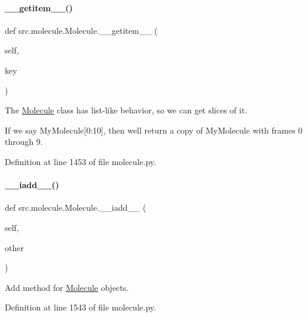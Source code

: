 \paragraph{\texorpdfstring{\+\_\+\+\_\+getitem\+\_\+\+\_\+()}{\_\_getitem\_\_()}}
{\footnotesize\ttfamily def src.\+molecule.\+Molecule.\+\_\+\+\_\+getitem\+\_\+\+\_\+ (\begin{DoxyParamCaption}\item[{}]{self,  }\item[{}]{key }\end{DoxyParamCaption})}



The \hyperlink{classsrc_1_1molecule_1_1Molecule}{Molecule} class has list-\/like behavior, so we can get slices of it. 

If we say My\+Molecule\mbox{[}0\+:10\mbox{]}, then we\textquotesingle{}ll return a copy of My\+Molecule with frames 0 through 9. 

Definition at line 1453 of file molecule.\+py.

\mbox{\label{classsrc_1_1molecule_1_1Molecule_a4a1e6648a99afd550e7b24db3a2b249b}} 
\paragraph{\texorpdfstring{\+\_\+\+\_\+iadd\+\_\+\+\_\+()}{\_\_iadd\_\_()}}
{\footnotesize\ttfamily def src.\+molecule.\+Molecule.\+\_\+\+\_\+iadd\+\_\+\+\_\+ (\begin{DoxyParamCaption}\item[{}]{self,  }\item[{}]{other }\end{DoxyParamCaption})}



Add method for \hyperlink{classsrc_1_1molecule_1_1Molecule}{Molecule} objects. 



Definition at line 1543 of file molecule.\+py.

